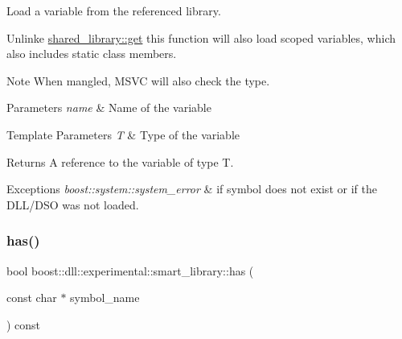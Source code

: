Load a variable from the referenced library.

Unlinke \hyperlink{a01708_a95aacb882bafadf535337c9c5cc0bea1}{shared\+\_\+library\+::get} this function will also load scoped variables, which also includes static class members.

\begin{DoxyNote}{Note}
When mangled, M\+S\+VC will also check the type.
\end{DoxyNote}

\begin{DoxyParams}{Parameters}
{\em name} & Name of the variable \\
\hline
\end{DoxyParams}

\begin{DoxyTemplParams}{Template Parameters}
{\em T} & Type of the variable \\
\hline
\end{DoxyTemplParams}
\begin{DoxyReturn}{Returns}
A reference to the variable of type T.
\end{DoxyReturn}

\begin{DoxyExceptions}{Exceptions}
{\em boost\+::system\+::system\+\_\+error} & if symbol does not exist or if the D\+L\+L/\+D\+SO was not loaded. \\
\hline
\end{DoxyExceptions}
\mbox{\label{a01712_a14d92d1f096a99ee1f59a6e6ac9c635c}} 
\subsubsection{\texorpdfstring{has()}{has()}\hspace{0.1cm}{\footnotesize\ttfamily [1/2]}}
{\footnotesize\ttfamily bool boost\+::dll\+::experimental\+::smart\+\_\+library\+::has (\begin{DoxyParamCaption}\item[{const char $\ast$}]{symbol\+\_\+name }\end{DoxyParamCaption}) const\hspace{0.3cm}{\ttfamily [inline]}}



